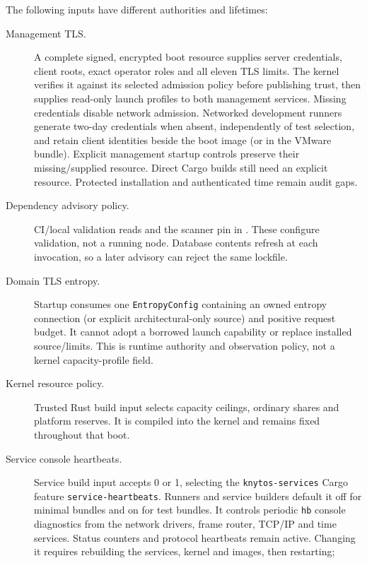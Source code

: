 The following inputs have different authorities and lifetimes:
\begin{description}
    \item[Management TLS.] A complete signed, encrypted boot resource supplies
        server credentials, client roots, exact operator roles and all eleven
        TLS limits. The kernel verifies it against its selected admission policy
        before publishing trust, then supplies read-only launch profiles to both
        management services. Missing credentials disable network admission.
        Networked development runners generate two-day credentials when absent,
        independently of test selection, and retain client identities beside the
        boot image (or in the VMware bundle). Explicit management startup controls
        preserve their missing/supplied resource. Direct Cargo builds still need
        an explicit resource.
        Protected installation and authenticated time remain audit gaps.
    \item[Dependency advisory policy.] CI/local validation reads
         and the scanner pin in .
        These configure validation, not a running node. Database contents refresh
        at each invocation, so a later advisory can reject the same lockfile.
    \item[Domain TLS entropy.] Startup consumes one \texttt{EntropyConfig}
        containing an owned entropy connection (or explicit architectural-only
        source) and positive request budget. It cannot adopt a borrowed launch
        capability or replace installed source/limits. This is runtime authority
        and observation policy, not a kernel capacity-profile field.
    \item[Kernel resource policy.] Trusted Rust build input selects capacity
        ceilings, ordinary shares and platform reserves. It is compiled into
        the kernel and remains fixed throughout that boot.
    \item[Service console heartbeats.] Service build input
         accepts 0 or 1, selecting the
        \texttt{knytos-services} Cargo feature \texttt{service-heartbeats}.
        Runners and service builders default it off for minimal bundles and on
        for test bundles. It controls periodic \texttt{hb} console diagnostics
        from the network drivers, frame router, TCP/IP and time services.
        Status counters and protocol heartbeats remain active. Changing it
        requires rebuilding the services, kernel and images, then restarting;

\end{description}
